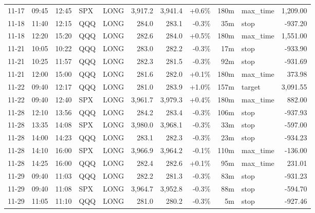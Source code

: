 \documentclass[11pt,a4paper,twoside]{article}
\begin{document}
\begin{center}
\begin{longtable}{>{\color{txtmain}}l l l l l r r r r >{\color{txtmain}}l r}
11-17 & 09:45 & 12:45 & SPX & LONG & 3,917.2 & 3,941.4 & \textcolor{wingreen}{+0.6\%} & 180m & max\_time & \textcolor{wingreen}{1,209.00} \\
11-18 & 11:40 & 12:15 & QQQ & LONG & 284.0 & 283.1 & \textcolor{lossred}{-0.3\%} & 35m & stop & \textcolor{lossred}{-937.20} \\
11-18 & 12:20 & 15:20 & QQQ & LONG & 282.6 & 284.0 & \textcolor{wingreen}{+0.5\%} & 180m & max\_time & \textcolor{wingreen}{1,551.00} \\
11-21 & 10:05 & 10:22 & QQQ & LONG & 283.0 & 282.2 & \textcolor{lossred}{-0.3\%} & 17m & stop & \textcolor{lossred}{-933.90} \\
11-21 & 10:25 & 11:57 & QQQ & LONG & 282.3 & 281.5 & \textcolor{lossred}{-0.3\%} & 92m & stop & \textcolor{lossred}{-931.69} \\
11-21 & 12:00 & 15:00 & QQQ & LONG & 281.6 & 282.0 & \textcolor{wingreen}{+0.1\%} & 180m & max\_time & \textcolor{wingreen}{373.98} \\
11-22 & 09:40 & 12:17 & QQQ & LONG & 281.0 & 283.9 & \textcolor{wingreen}{+1.0\%} & 157m & target & \textcolor{wingreen}{3,091.55} \\
11-22 & 09:40 & 12:40 & SPX & LONG & 3,961.7 & 3,979.3 & \textcolor{wingreen}{+0.4\%} & 180m & max\_time & \textcolor{wingreen}{882.00} \\
11-28 & 12:10 & 13:56 & QQQ & LONG & 284.2 & 283.4 & \textcolor{lossred}{-0.3\%} & 106m & stop & \textcolor{lossred}{-937.93} \\
11-28 & 13:35 & 14:08 & SPX & LONG & 3,980.0 & 3,968.1 & \textcolor{lossred}{-0.3\%} & 33m & stop & \textcolor{lossred}{-597.00} \\
11-28 & 14:00 & 14:23 & QQQ & LONG & 283.1 & 282.3 & \textcolor{lossred}{-0.3\%} & 23m & stop & \textcolor{lossred}{-934.23} \\
11-28 & 14:10 & 16:00 & SPX & LONG & 3,966.9 & 3,964.2 & \textcolor{lossred}{-0.1\%} & 110m & max\_time & \textcolor{lossred}{-136.00} \\
11-28 & 14:25 & 16:00 & QQQ & LONG & 282.4 & 282.6 & \textcolor{wingreen}{+0.1\%} & 95m & max\_time & \textcolor{wingreen}{231.01} \\
11-29 & 09:40 & 11:03 & QQQ & LONG & 282.2 & 281.3 & \textcolor{lossred}{-0.3\%} & 83m & stop & \textcolor{lossred}{-931.23} \\
11-29 & 09:40 & 11:08 & SPX & LONG & 3,964.7 & 3,952.8 & \textcolor{lossred}{-0.3\%} & 88m & stop & \textcolor{lossred}{-594.70} \\
11-29 & 11:05 & 11:10 & QQQ & LONG & 281.0 & 280.2 & \textcolor{lossred}{-0.3\%} & 5m & stop & \textcolor{lossred}{-927.46} \\

\end{longtable}
\end{center}
\end{document}

